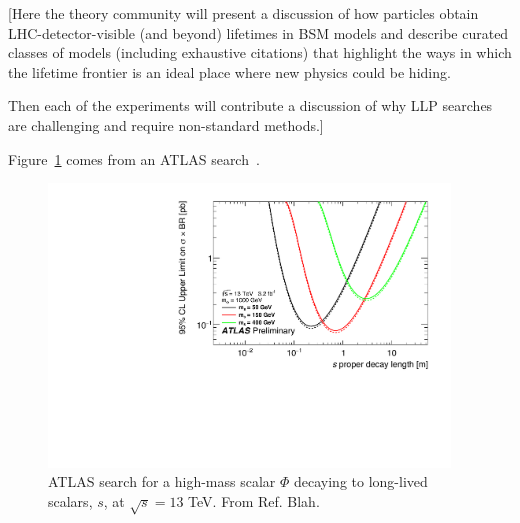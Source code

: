 [Here the theory community will present a discussion of how particles obtain LHC-detector-visible (and beyond) lifetimes in BSM models and describe curated classes of models (including exhaustive citations) that highlight the ways in which the lifetime frontier is an ideal place where new physics could be hiding.

Then each of the experiments will contribute a discussion of why LLP searches are challenging and require non-standard methods.]

Figure~\ref{fig:ATLASCalRatio1} comes from an ATLAS search~\cite{ATLAS-CONF-2016-103}.

\begin{figure}
\centering
\includegraphics[width=0.95\textwidth]{figures/ATLAS_CalRatio_2016_m1TeV_fig_11c}
\caption{ATLAS search for a high-mass scalar $\Phi$ decaying to long-lived scalars, $s$, at $\sqrt{s} = 13$ TeV. From Ref. Blah.}
\label{fig:ATLASCalRatio1}
\end{figure}